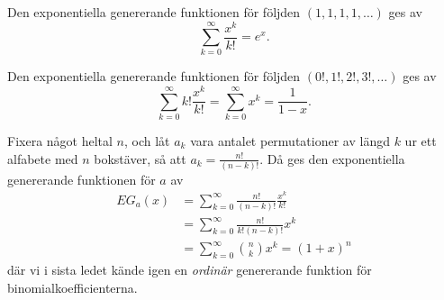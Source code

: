 \documentclass[nobib]{tufte-handout}
\begin{document}
\begin{example}
  Den exponentiella genererande funktionen för följden $(1,1,1,1,\ldots)$ ges av
  $$\sum_{k=0}^{\infty} \frac{x^k}{k!} = e^x.$$
\end{example}

\begin{example}
  Den exponentiella genererande funktionen för följden $(0!, 1!, 2!, 3!, \ldots)$ ges av
  $$\sum_{k=0}^{\infty} k!\frac{x^k}{k!} = \sum_{k=0}^{\infty} x^k = \frac{1}{1-x}.$$
\end{example}

\begin{example}
  Fixera något heltal $n$, och låt $a_k$ vara antalet permutationer av längd $k$ ur ett alfabete med $n$ bokstäver, så att $a_k = \frac{n!}{(n-k)!}$. Då ges den exponentiella genererande funktionen för $a$ av
  \begin{align*}
    EG_a(x) &= \sum_{k=0}^{\infty} \frac{n!}{(n-k)!}\frac{x^k}{k!}\\
    &= \sum_{k=0}^{\infty} \frac{n!}{k!(n-k)!}x^k\\
    &= \sum_{k=0}^{\infty} \binom{n}{k} x^k = (1 + x)^n
  \end{align*}
  där vi i sista ledet kände igen en \emph{ordinär} genererande funktion för binomialkoefficienterna.
\end{example}
\end{document}
